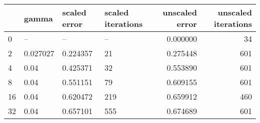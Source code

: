 \begin{tabular}{llllrr}
\toprule
{} &     gamma & scaled error & scaled iterations &  unscaled error &  unscaled iterations \\
\midrule
0  &        -- &           -- &                -- &        0.000000 &                   34 \\
2  &  0.027027 &     0.224357 &                21 &        0.275448 &                  601 \\
4  &      0.04 &     0.425371 &                32 &        0.553890 &                  601 \\
8  &      0.04 &     0.551151 &                79 &        0.609155 &                  601 \\
16 &      0.04 &     0.620472 &               219 &        0.659912 &                  460 \\
32 &      0.04 &     0.657101 &               555 &        0.674689 &                  601 \\
\bottomrule
\end{tabular}
